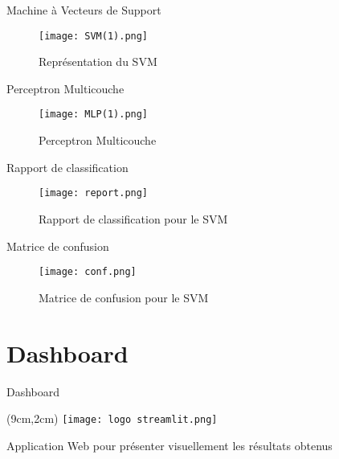 \documentclass[10pt,sans,usenames,dvipsnames,english,compress]{beamer}
\begin{document}
\begin{frame}{Machine à Vecteurs de Support}
\begin{figure}[!h]
    \centering
    \texttt{[image: SVM(1).png]}
    \caption{Représentation du SVM}
\end{figure}
\end{frame}

\begin{frame}{Perceptron Multicouche}
\begin{figure}[!h]
    \centering
    \texttt{[image: MLP(1).png]}
    \caption{Perceptron Multicouche}
\end{figure}
\end{frame}

\begin{frame}{Rapport de classification}
    \begin{figure}[!h]
    \centering
    \texttt{[image: report.png]}
    \caption{Rapport de classification pour le SVM}
    \end{figure}
\end{frame}

\begin{frame}{Matrice de confusion}
    \begin{figure}[!h]
    \centering
    \texttt{[image: conf.png]}
    \caption{Matrice de confusion pour le SVM}
    \end{figure}
\end{frame}

\section{Dashboard}
\begin{frame}{Dashboard}
	\begin{textblock*}{3cm}(9cm,2cm)
		\texttt{[image: logo streamlit.png]}
	\end{textblock*}

	\vspace{1cm}

	\begin{block}{}
		Application Web pour présenter visuellement les résultats obtenus
	\end{block}

        \vspace{0.5cm}

\end{frame}
\end{document}
